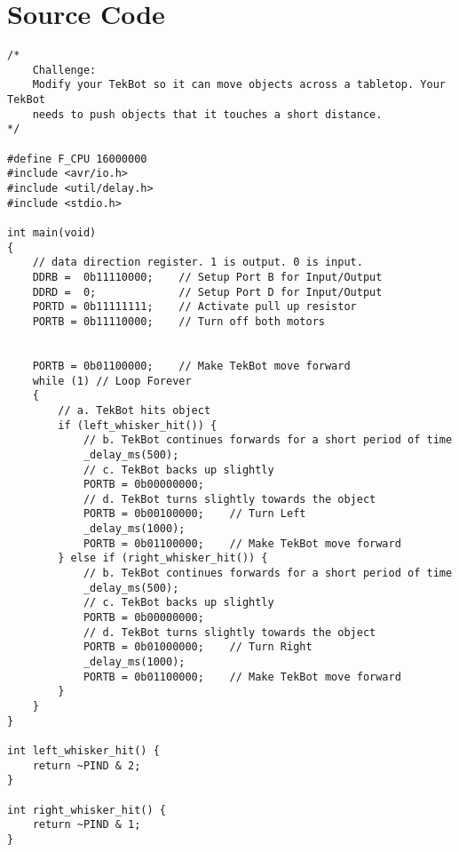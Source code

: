 \documentclass[12pt,letterpaper]{article}
\begin{document}
\section{Source Code}
\begin{verbatim}
/*
    Challenge:
    Modify your TekBot so it can move objects across a tabletop. Your TekBot
    needs to push objects that it touches a short distance. 
*/

#define F_CPU 16000000
#include <avr/io.h>
#include <util/delay.h>
#include <stdio.h>

int main(void)
{
    // data direction register. 1 is output. 0 is input.
    DDRB =  0b11110000;    // Setup Port B for Input/Output
    DDRD =  0;             // Setup Port D for Input/Output
    PORTD = 0b11111111;    // Activate pull up resistor
    PORTB = 0b11110000;    // Turn off both motors


    PORTB = 0b01100000;    // Make TekBot move forward
    while (1) // Loop Forever
    {
        // a. TekBot hits object
        if (left_whisker_hit()) {
            // b. TekBot continues forwards for a short period of time
            _delay_ms(500);
            // c. TekBot backs up slightly
            PORTB = 0b00000000;
            // d. TekBot turns slightly towards the object
            PORTB = 0b00100000;    // Turn Left
            _delay_ms(1000);
            PORTB = 0b01100000;    // Make TekBot move forward
        } else if (right_whisker_hit()) {
            // b. TekBot continues forwards for a short period of time
            _delay_ms(500);
            // c. TekBot backs up slightly
            PORTB = 0b00000000;
            // d. TekBot turns slightly towards the object
            PORTB = 0b01000000;    // Turn Right
            _delay_ms(1000);
            PORTB = 0b01100000;    // Make TekBot move forward
        }
    }
}

int left_whisker_hit() {
    return ~PIND & 2;
}

int right_whisker_hit() {
    return ~PIND & 1;
}
\end{verbatim}
\end{document}
